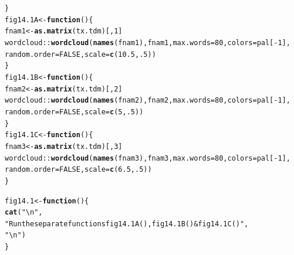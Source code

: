 \documentclass[12pt, a4paper,  BCOR=8.25mm, DIV=15]{scrartcl}\usepackage[]{graphicx}\usepackage[]{color}
\makeatletter
\newcommand{\hlnum}[1]{\textcolor[rgb]{0.686,0.059,0.569}{#1}}%
\newcommand{\hlstr}[1]{\textcolor[rgb]{0.192,0.494,0.8}{#1}}%
\newcommand{\hlopt}[1]{\textcolor[rgb]{0,0,0}{#1}}%
\newcommand{\hlstd}[1]{\textcolor[rgb]{0.345,0.345,0.345}{#1}}%
\newcommand{\hlkwa}[1]{\textcolor[rgb]{0.161,0.373,0.58}{\textbf{#1}}}%
\newcommand{\hlkwb}[1]{\textcolor[rgb]{0.69,0.353,0.396}{#1}}%
\newcommand{\hlkwc}[1]{\textcolor[rgb]{0.333,0.667,0.333}{#1}}%
\newcommand{\hlkwd}[1]{\textcolor[rgb]{0.737,0.353,0.396}{\textbf{#1}}}%
\newenvironment{kframe}{%
 \def\at@end@of@kframe{}%
 \ifinner\ifhmode%
  \def\at@end@of@kframe{\end{minipage}}%
  \begin{minipage}{\columnwidth}%
 \fi\fi%
 \def\FrameCommand##1{\hskip\@totalleftmargin \hskip-\fboxsep
 \colorbox{shadecolor}{##1}\hskip-\fboxsep
     \hskip-\linewidth \hskip-\@totalleftmargin \hskip\columnwidth}%
 \MakeFramed {\advance\hsize-\width
   \@totalleftmargin\z@ \linewidth\hsize
   \@setminipage}}%
 {\par\unskip\endMakeFramed%
 \at@end@of@kframe}
\newenvironment{knitrout}{}{} %
\makeatother
\begin{document}
\begin{knitrout}
\begin{kframe}
\begin{alltt}
\hlstd{\}}
\hlstd{fig14.1A} \hlkwb{<-} \hlkwa{function}\hlstd{()\{}
\hlstd{fnam1} \hlkwb{<-} \hlkwd{as.matrix}\hlstd{(tx.tdm)[,}\hlnum{1}\hlstd{]}
\hlstd{wordcloud}\hlopt{::}\hlkwd{wordcloud}\hlstd{(}\hlkwd{names}\hlstd{(fnam1), fnam1,} \hlkwc{max.words}\hlstd{=}\hlnum{80}\hlstd{,} \hlkwc{colors}\hlstd{=pal[}\hlopt{-}\hlnum{1}\hlstd{],}
          \hlkwc{random.order}\hlstd{=}\hlnum{FALSE}\hlstd{,} \hlkwc{scale}\hlstd{=}\hlkwd{c}\hlstd{(}\hlnum{10.5}\hlstd{,}\hlnum{.5}\hlstd{))}
\hlstd{\}}
\hlstd{fig14.1B} \hlkwb{<-} \hlkwa{function}\hlstd{()\{}
\hlstd{fnam2} \hlkwb{<-} \hlkwd{as.matrix}\hlstd{(tx.tdm)[,}\hlnum{2}\hlstd{]}
\hlstd{wordcloud}\hlopt{::}\hlkwd{wordcloud}\hlstd{(}\hlkwd{names}\hlstd{(fnam2), fnam2,} \hlkwc{max.words}\hlstd{=}\hlnum{80}\hlstd{,} \hlkwc{colors}\hlstd{=pal[}\hlopt{-}\hlnum{1}\hlstd{],}
          \hlkwc{random.order}\hlstd{=}\hlnum{FALSE}\hlstd{,} \hlkwc{scale}\hlstd{=}\hlkwd{c}\hlstd{(}\hlnum{5}\hlstd{,}\hlnum{.5}\hlstd{))}
\hlstd{\}}
\hlstd{fig14.1C} \hlkwb{<-} \hlkwa{function}\hlstd{()\{}
\hlstd{fnam3} \hlkwb{<-} \hlkwd{as.matrix}\hlstd{(tx.tdm)[,}\hlnum{3}\hlstd{]}
\hlstd{wordcloud}\hlopt{::}\hlkwd{wordcloud}\hlstd{(}\hlkwd{names}\hlstd{(fnam3), fnam3,} \hlkwc{max.words}\hlstd{=}\hlnum{80}\hlstd{,} \hlkwc{colors}\hlstd{=pal[}\hlopt{-}\hlnum{1}\hlstd{],}
          \hlkwc{random.order}\hlstd{=}\hlnum{FALSE}\hlstd{,} \hlkwc{scale}\hlstd{=}\hlkwd{c}\hlstd{(}\hlnum{6.5}\hlstd{,}\hlnum{.5}\hlstd{))}
\hlstd{\}}
\end{alltt}
\end{kframe}
\end{knitrout}

\begin{knitrout}
\color{fgcolor}\begin{kframe}
\begin{alltt}
\hlstd{fig14.1} \hlkwb{<-} \hlkwa{function}\hlstd{()\{}
    \hlkwd{cat}\hlstd{(}\hlstr{"\textbackslash{}n"}\hlstd{,}
        \hlstr{"Run the separate functions fig14.1A(), fig14.1B() & fig14.1C()"}\hlstd{,}
        \hlstr{"\textbackslash{}n"}\hlstd{)}
\hlstd{\}}
\end{alltt}
\end{kframe}
\end{knitrout}
\end{document}
